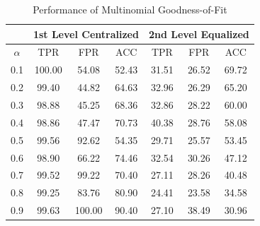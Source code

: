\documentclass[10pt,conference,letterpaper]{IEEEtran}
\begin{document}
			\begin{table}[!ht]
				\centering
				\caption{Performance of Multinomial Goodness-of-Fit}
				\label{tab:mgof}
				\begin{tabular}{|c|c|c|c|c|c|c|}
					\hline
					& \multicolumn{3}{c|}{1st Level Centralized} & \multicolumn{3}{c|}{2nd Level Equalized}\\
					\hline 
					$\alpha$ & TPR & FPR & ACC & TPR & FPR & ACC \\ 
					\hline 
					0.1 & 100.00 & 54.08 & 52.43 & 31.51 & 26.52 & 69.72 \\ 
					\hline 
					0.2 & 99.40 & 44.82 & 64.63 & 32.96 & 26.29 & 65.20 \\ 
					\hline 
					0.3 & 98.88 & 45.25 & 68.36 & 32.86 & 28.22 & 60.00 \\ 
					\hline 
					0.4 & 98.86 & 47.47 & 70.73 & 40.38 & 28.76 & 58.08 \\ 
					\hline 
					0.5 & 99.56 & 92.62 & 54.35 & 29.71 & 25.57 & 53.45 \\ 
					\hline 
					0.6 & 98.90 & 66.22 & 74.46 & 32.54 & 30.26 & 47.12 \\ 
					\hline 
					0.7 & 99.52 & 99.22 & 70.40 & 27.11 & 28.26 & 40.48 \\ 
					\hline 
					0.8 & 99.25 & 83.76 & 80.90 & 24.41 & 23.58 & 34.58 \\ 
					\hline 
					0.9 & 99.63 & 100.00 & 90.40 & 27.10 & 38.49 & 30.96 \\ 
					\hline 
				\end{tabular} 
			\end{table}
		
\end{document}
